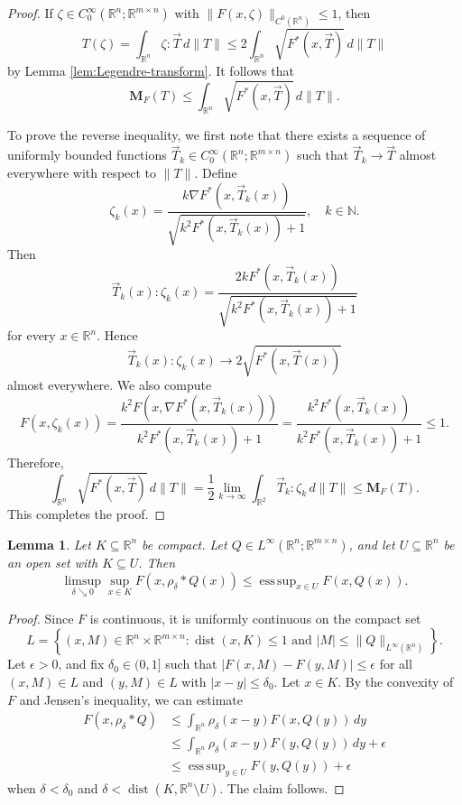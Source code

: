 \documentclass[a4paper]{article}
\newcommand{\R}{\mathbb{R}}
\newcommand{\N}{\mathbb{N}}
\newcommand{\M}{\mathbf{M}}
\newcommand{\grad}{\nabla}
\DeclareMathOperator{\dist}{dist}
\DeclareMathOperator*{\esssup}{ess \, sup}
\newcommand{\set}[2]{\left\{ #1 \colon #2 \right\}}
\newtheorem{lemma}[theorem]{Lemma}
\theoremstyle{definition}
\theoremstyle{remark}
\begin{document}
\begin{proof}
If $\zeta \in C_0^\infty(\R^n; \R^{m \times n})$ with
$\|F(x, \zeta)\|_{C^0(\R^n)} \le 1$, then
\[
T(\zeta) = \int_{\R^n} \zeta : \vec{T} \, d\|T\| \le 2\int_{\R^n} \sqrt{F^*(x, \vec{T})} \, d\|T\|
\]
by Lemma \ref{lem:Legendre-transform}. It follows that
\[
\M_F(T) \le \int_{\R^n} \sqrt{F^*(x, \vec{T})} \, d\|T\|.
\]

To prove the reverse inequality, we first note that there exists 
a sequence of uniformly bounded functions
$\vec{T}_k \in C_0^\infty(\R^n; \R^{m \times n})$ such that
$\vec{T}_k \to \vec{T}$ almost everywhere with respect to $\|T\|$.
Define
\[
\zeta_k(x) = \frac{k\grad F^*(x, \vec{T}_k(x))}{\sqrt{k^2 F^*(x, \vec{T}_k(x)) + 1}}, \quad k \in \N.
\]
Then
\[
\vec{T}_k(x) : \zeta_k(x) = \frac{2k F^*(x, \vec{T}_k(x))}{\sqrt{k^2 F^*(x, \vec{T}_k(x)) + 1}}
\]
for every $x \in \R^n$. Hence
\[
\vec{T}_k(x) : \zeta_k(x) \to 2\sqrt{F^*(x, \vec{T}(x))}
\]
almost everywhere. We also compute
\[
F(x, \zeta_k(x)) = \frac{k^2 F(x, \grad F^*(x, \vec{T}_k(x)))}{k^2 F^*(x, \vec{T}_k(x)) + 1} = \frac{k^2 F^*(x, \vec{T}_k(x))}{k^2 F^*(x, \vec{T}_k(x)) + 1} \le 1.
\]
Therefore,
\[
\int_{\R^n} \sqrt{F^*(x, \vec{T})} \, d\|T\| = \frac{1}{2} \lim_{k \to \infty}\int_{\R^2} \vec{T}_k : \zeta_k \, d\|T\| \le \M_F(T).
\]
This completes the proof.
\end{proof}

\begin{lemma} \label{lem:F-composed-with-convolution}
Let $K \subseteq \R^n$ be compact. Let $Q \in L^\infty(\R^n; \R^{m \times n})$, and let $U \subseteq \R^n$ be an open set with $K \subseteq U$.
Then
\[
\limsup_{\delta \searrow 0} \sup_{x \in K} F(x, \rho_\delta * Q(x)) \le \esssup_{x \in U} F(x, Q(x)).
\]
\end{lemma}

\begin{proof}
Since $F$ is continuous, it is uniformly continuous on the compact set
\[
L = \set{(x, M) \in \R^n \times \R^{m \times n}}{\dist(x, K) \le 1 \text{ and } |M| \le \|Q\|_{L^\infty(\R^n)}}.
\]
Let $\epsilon > 0$, and fix $\delta_0 \in (0, 1]$ such that
$|F(x, M) - F(y, M)| \le \epsilon$ for all $(x, M) \in L$ and $(y, M) \in L$ with $|x - y| \le \delta_0$.
Let $x \in K$. By the convexity of $F$ and Jensen's inequality, we can estimate
\[
\begin{split}
F(x, \rho_\delta * Q) & \le \int_{\R^n} \rho_\delta(x - y) F(x, Q(y)) \, dy \\
& \le \int_{\R^n} \rho_\delta(x - y) F(y, Q(y)) \, dy + \epsilon \\
& \le \esssup_{y \in U} F(y, Q(y)) + \epsilon
\end{split}
\]
when $\delta < \delta_0$ and $\delta < \dist(K, \R^n \setminus U)$. The claim follows.
\end{proof}
\end{document}

